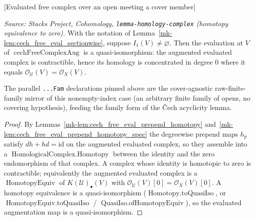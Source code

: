 \begin{lemma}

[Evaluated free complex over an open meeting a cover member]
  \label{mk-lem:cech_free_eval_nonempty}

  \textit{Source: Stacks Project, Cohomology, \texttt{lemma-homology-complex}
  (homotopy equivalence to zero).}
  With the notation of Lemma~\ref{mk-lem:cech_free_eval_sectionwise}, suppose
  \(I_1(V) \neq \varnothing\). Then the evaluation at \(V\) of
  \(\operatorname{cechFreeComplexAug}\) is a quasi-isomorphism: the augmented
  evaluated complex is contractible, hence its homology is concentrated in degree
  \(0\) where it equals \(\mathcal{O}_{\mathcal{U}}(V) = \mathcal{O}_X(V)\).

  The parallel \texttt{...Fam} declarations pinned above are the cover-agnostic
  raw-finite-family mirror of this nonempty-index case (an arbitrary finite family of
  opens, no covering hypothesis), feeding the family form of the {\v C}ech
  acyclicity lemma.
\end{lemma}

\begin{proof}
  By Lemmas~\ref{mk-lem:cech_free_eval_prepend_homotopy}
  and~\ref{mk-lem:cech_free_eval_prepend_homotopy_spec} the degreewise prepend maps
  \(h_p\) satisfy \(dh + hd = \mathrm{id}\) on the augmented evaluated complex, so they
  assemble into a \(\operatorname{HomologicalComplex.Homotopy}\) between the identity
  and the zero endomorphism of that complex. A complex whose identity is homotopic to
  zero is contractible; equivalently the augmented evaluated complex is a
  \(\operatorname{HomotopyEquiv}\) of \(K(\mathcal{U})_\bullet(V)\) with
  \(\mathcal{O}_{\mathcal{U}}(V)[0] = \mathcal{O}_X(V)[0]\). A homotopy equivalence is a
  quasi-isomorphism (\(\operatorname{Homotopy.toQuasiIso}\), or
  \(\operatorname{HomotopyEquiv.toQuasiIso}\) /
  \(\operatorname{QuasiIso.ofHomotopyEquiv}\)), so the evaluated augmentation map is a
  quasi-isomorphism.
\end{proof}

